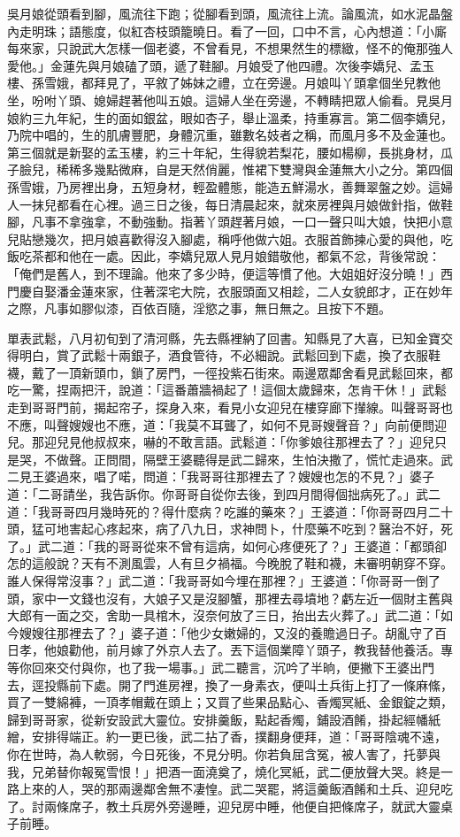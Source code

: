 吳月娘從頭看到腳，風流往下跑；從腳看到頭，風流往上流。論風流，如水泥晶盤內走明珠；語態度，似紅杏枝頭籠曉日。看了一回，口中不言，心內想道：「小廝每來家，只說武大怎樣一個老婆，不曾看見，不想果然生的標緻，怪不的俺那強人愛他。」金蓮先與月娘磕了頭，遞了鞋腳。月娘受了他四禮。次後李嬌兒、孟玉樓、孫雪娥，都拜見了，平敘了姊妹之禮，立在旁邊。月娘叫丫頭拿個坐兒教他坐，吩咐丫頭、媳婦趕著他叫五娘。這婦人坐在旁邊，不轉睛把眾人偷看。見吳月娘約三九年紀，生的面如銀盆，眼如杏子，舉止溫柔，持重寡言。第二個李嬌兒，乃院中唱的，生的肌膚豐肥，身體沉重，雖數名妓者之稱，而風月多不及金蓮也。第三個就是新娶的孟玉樓，約三十年紀，生得貌若梨花，腰如楊柳，長挑身材，瓜子臉兒，稀稀多幾點微麻，自是天然俏麗，惟裙下雙灣與金蓮無大小之分。第四個孫雪娥，乃房裡出身，五短身材，輕盈體態，能造五鮮湯水，善舞翠盤之妙。這婦人一抹兒都看在心裡。過三日之後，每日清晨起來，就來房裡與月娘做針指，做鞋腳，凡事不拿強拿，不動強動。指著丫頭趕著月娘，一口一聲只叫大娘，快把小意兒貼戀幾次，把月娘喜歡得沒入腳處，稱呼他做六姐。衣服首飾揀心愛的與他，吃飯吃茶都和他在一處。因此，李嬌兒眾人見月娘錯敬他，都氣不忿，背後常說：「俺們是舊人，到不理論。他來了多少時，便這等慣了他。大姐姐好沒分曉！」西門慶自娶潘金蓮來家，住著深宅大院，衣服頭面又相趁，二人女貌郎才，正在妙年之際，凡事如膠似漆，百依百隨，淫慾之事，無日無之。且按下不題。

單表武鬆，八月初旬到了清河縣，先去縣裡納了回書。知縣見了大喜，已知金寶交得明白，賞了武鬆十兩銀子，酒食管待，不必細說。武鬆回到下處，換了衣服鞋襪，戴了一頂新頭巾，鎖了房門，一徑投紫石街來。兩邊眾鄰舍看見武鬆回來，都吃一驚，捏兩把汗，說道：「這番蕭牆禍起了！這個太歲歸來，怎肯干休！」武鬆走到哥哥門前，揭起帘子，探身入來，看見小女迎兒在樓穿廊下攆線。叫聲哥哥也不應，叫聲嫂嫂也不應，道：「我莫不耳聾了，如何不見哥嫂聲音？」向前便問迎兒。那迎兒見他叔叔來，嚇的不敢言語。武鬆道：「你爹娘往那裡去了？」迎兒只是哭，不做聲。正問間，隔壁王婆聽得是武二歸來，生怕決撒了，慌忙走過來。武二見王婆過來，唱了喏，問道：「我哥哥往那裡去了？嫂嫂也怎的不見？」婆子道：「二哥請坐，我告訴你。你哥哥自從你去後，到四月間得個拙病死了。」武二道：「我哥哥四月幾時死的？得什麼病？吃誰的藥來？」王婆道：「你哥哥四月二十頭，猛可地害起心疼起來，病了八九日，求神問卜，什麼藥不吃到？醫治不好，死了。」武二道：「我的哥哥從來不曾有這病，如何心疼便死了？」王婆道：「都頭卻怎的這般說？天有不測風雲，人有旦夕禍福。今晚脫了鞋和襪，未審明朝穿不穿。誰人保得常沒事？」武二道：「我哥哥如今埋在那裡？」王婆道：「你哥哥一倒了頭，家中一文錢也沒有，大娘子又是沒腳蟹，那裡去尋墳地？虧左近一個財主舊與大郎有一面之交，舍助一具棺木，沒奈何放了三日，抬出去火葬了。」武二道：「如今嫂嫂往那裡去了？」婆子道：「他少女嫩婦的，又沒的養贍過日子。胡亂守了百日孝，他娘勸他，前月嫁了外京人去了。丟下這個業障丫頭子，教我替他養活。專等你回來交付與你，也了我一場事。」武二聽言，沉吟了半晌，便撇下王婆出門去，逕投縣前下處。開了門進房裡，換了一身素衣，便叫土兵街上打了一條麻絛，買了一雙綿褲，一頂孝帽戴在頭上；又買了些果品點心、香燭冥紙、金銀錠之類，歸到哥哥家，從新安設武大靈位。安排羹飯，點起香燭，鋪設酒餚，掛起經幡紙繒，安排得端正。約一更已後，武二拈了香，撲翻身便拜，道：「哥哥陰魂不遠，你在世時，為人軟弱，今日死後，不見分明。你若負屈含冤，被人害了，托夢與我，兄弟替你報冤雪恨！」把酒一面澆奠了，燒化冥紙，武二便放聲大哭。終是一路上來的人，哭的那兩邊鄰舍無不凄惶。武二哭罷，將這羹飯酒餚和土兵、迎兒吃了。討兩條席子，教土兵房外旁邊睡，迎兒房中睡，他便自把條席子，就武大靈桌子前睡。

